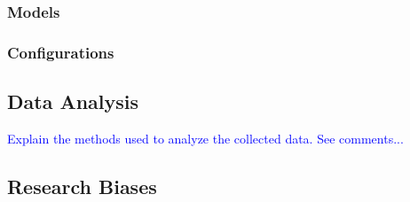 \subsubsection{Models}
%

\subsubsection{Configurations}
%

\subsection{Data Analysis}
%
%
\textcolor{blue}{Explain the methods used to analyze the collected data. See comments...}

\subsection{Research Biases}
%
